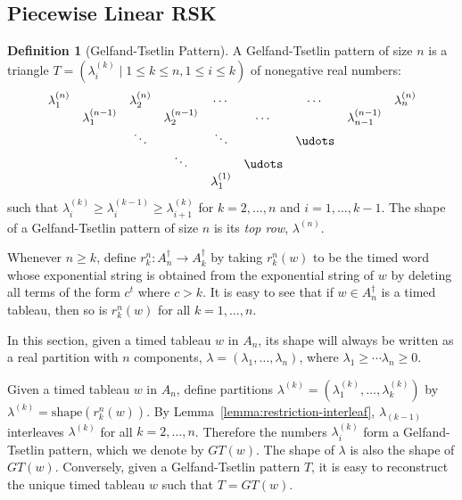 \documentclass[10pt]{amsproc}
\theoremstyle{definition}
\newtheorem{definition}[theorem]{Definition}
\theoremstyle{remark}
\newcommand{\shape}{\mathrm{shape}}
\begin{document}
\subsection{Piecewise Linear RSK}
\label{sec:piecewise-linear-rsk}
\begin{definition}
  [Gelfand-Tsetlin Pattern]
  A Gelfand-Tsetlin pattern of size $n$ is a triangle $T=(\lambda^{(k)}_i\mid 1\leq k \leq n, 1\leq i \leq k)$ of nonegative real numbers:
  \begin{displaymath}
    \begin{matrix}
      \lambda^{(n)}_1 & & \lambda^{(n)}_2 && \dotsb && \dotsb && \lambda^{(n)}_n\\
      &\lambda^{(n-1)}_1 && \lambda^{(n-1)}_2 && \dotsb && \lambda^{(n-1)}_{n-1} & \\
      && \ddots && \ddots && \udots &&  \\
      &&& \ddots && \udots &&&\\
      &&&& \lambda^{(1)}_1 &&&&
    \end{matrix}
  \end{displaymath}
  such that $\lambda^{(k)}_i\geq \lambda^{(k-1)}_i\geq \lambda^{(k)}_{i+1}$ for $k=2,\dotsc,n$ and $i=1,\dotsc, k-1$.
  The shape of a Gelfand-Tsetlin pattern of size $n$ is its \emph{top row}, $\lambda^{(n)}$.
\end{definition}
Whenever $n\geq k$, define $r^n_k:A_n^\dagger\to A_k^\dagger$ by taking $r^n_k(w)$ to be the timed word whose exponential string is obtained from the exponential string of $w$ by deleting all terms of the form $c^t$ where $c>k$.
It is easy to see that if $w\in A_n^\dagger$ is a timed tableau, then so is $r^n_k(w)$ for all $k=1,\dotsc,n$.

In this section, given a timed tableau $w$ in $A_n$, its shape will always be written as a real partition with $n$ components, $\lambda=(\lambda_1,\dotsc,\lambda_n)$, where $\lambda_1\geq \dotsb \lambda_n\geq 0$.

Given a timed tableau $w$ in $A_n$, define partitions $\lambda^{(k)}=(\lambda^{(k)}_1,\dotsc,\lambda^{(k)}_k)$ by $\lambda^{(k)} = \shape(r^n_k(w))$.
By Lemma~\ref{lemma:restriction-interleaf}, $\lambda_{(k-1)}$ interleaves $\lambda^{(k)}$ for all $k=2,\dotsc,n$.
Therefore the numbers $\lambda^{(k)}_i$ form a Gelfand-Tsetlin pattern, which we denote by $GT(w)$.
The shape of $\lambda$ is also the shape of $GT(w)$.
Conversely, given a Gelfand-Tsetlin pattern $T$, it is easy to reconstruct the unique timed tableau $w$ such that $T=GT(w)$.
\end{document}
